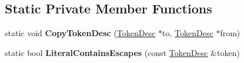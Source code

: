 \subsection*{Static Private Member Functions}
\begin{DoxyCompactItemize}
\item 
static void {\bfseries Copy\+Token\+Desc} (\hyperlink{structv8_1_1internal_1_1_scanner_1_1_token_desc}{Token\+Desc} $\ast$to, \hyperlink{structv8_1_1internal_1_1_scanner_1_1_token_desc}{Token\+Desc} $\ast$from)\hypertarget{classv8_1_1internal_1_1_scanner_ada7abc4bc3b9fb05dc4e83170aa5e476}{}\label{classv8_1_1internal_1_1_scanner_ada7abc4bc3b9fb05dc4e83170aa5e476}

\item 
static bool {\bfseries Literal\+Contains\+Escapes} (const \hyperlink{structv8_1_1internal_1_1_scanner_1_1_token_desc}{Token\+Desc} \&token)\hypertarget{classv8_1_1internal_1_1_scanner_a28e98efbf0bf35dd1c1a2c551204dd34}{}\label{classv8_1_1internal_1_1_scanner_a28e98efbf0bf35dd1c1a2c551204dd34}

\end{DoxyCompactItemize}
